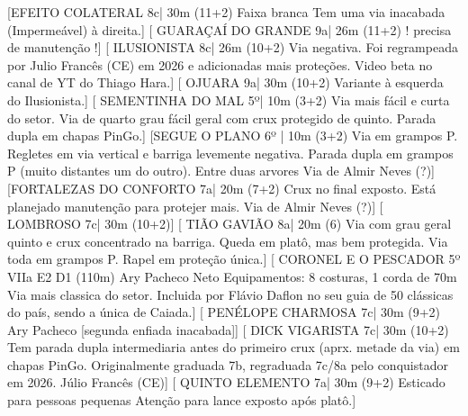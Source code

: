 
\begin{CGSectorRoutes}
    [EFEITO COLATERAL 8c| 30m (11+2) Faixa branca Tem uma via inacabada (Impermeável) à direita.]
    [ GUARAÇAÍ DO GRANDE 9a| 26m (11+2) ! precisa de manutenção !]
    [ ILUSIONISTA 8c| 26m (10+2) Via negativa. Foi regrampeada por Julio Francês (CE) em 2026 e adicionadas mais proteções. Video beta no canal de YT do Thiago Hara.]
    [ OJUARA 9a| 30m (10+2) Variante à esquerda do Ilusionista.]
    [ SEMENTINHA DO MAL 5º| 10m (3+2) Via mais fácil e curta do setor. Via de quarto grau fácil geral com crux protegido de quinto. Parada dupla em chapas PinGo.]
    [SEGUE O PLANO 6º | 10m (3+2) Via em grampos P. Regletes em via vertical e barriga levemente negativa. Parada dupla em grampos P (muito distantes um do outro). Entre duas arvores Via de Almir Neves (?)]
    [FORTALEZAS DO CONFORTO 7a| 20m (7+2) Crux no final exposto. Está planejado manutenção para protejer mais. Via de Almir Neves (?)]
    [ LOMBROSO 7c| 30m (10+2)]
    [ TIÃO GAVIÃO 8a| 20m (6) Via com grau geral quinto e crux concentrado na barriga. Queda em platô, mas bem protegida. Via toda em grampos P. Rapel em proteção única.]
    [ CORONEL E O PESCADOR 5º VIIa E2 D1 (110m) Ary Pacheco Neto
Equipamentos: 8 costuras, 1 corda de 70m Via mais classica do setor. Incluida por
Flávio Daflon no seu guia de 50 clássicas do país, sendo a única de Caiada.]
    [ PENÉLOPE CHARMOSA 7c| 30m (9+2) Ary Pacheco [segunda enfiada inacabada]]
    [ DICK VIGARISTA 7c| 30m (10+2) Tem parada dupla intermediaria antes do primeiro crux (aprx. metade da via) em chapas PinGo. Originalmente graduada 7b, regraduada 7c/8a pelo conquistador em 2026. Júlio Francês (CE)]
    [ QUINTO ELEMENTO 7a| 30m (9+2) Esticado para pessoas pequenas Atenção para lance exposto após platô.]

\end{CGSectorRoutes}
